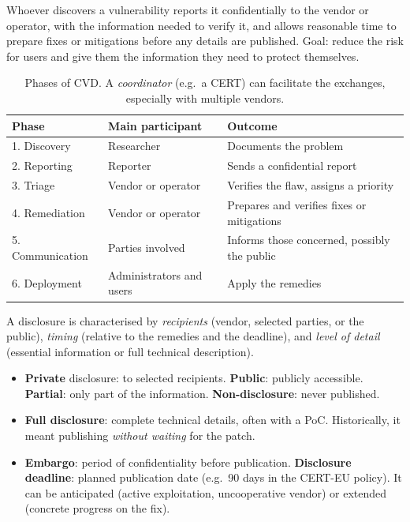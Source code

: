\begin{definition}
Whoever discovers a vulnerability reports it confidentially to the vendor or operator, with the information needed to verify it, and allows reasonable time to prepare fixes or mitigations before any details are published. Goal: reduce the risk for users and give them the information they need to protect themselves.
\end{definition}

\begin{table}[H]
\centering
\caption{Phases of CVD. A \emph{coordinator} (e.g.\ a CERT) can facilitate the exchanges, especially with multiple vendors.}
\label{tab:cvd}
\begin{tabular}{@{}lll@{}}
\toprule
Phase & Main participant & Outcome \\
\midrule
1. Discovery     & Researcher               & Documents the problem \\
2. Reporting     & Reporter                 & Sends a confidential report \\
3. Triage        & Vendor or operator       & Verifies the flaw, assigns a priority \\
4. Remediation   & Vendor or operator       & Prepares and verifies fixes or mitigations \\
5. Communication & Parties involved         & Informs those concerned, possibly the public \\
6. Deployment    & Administrators and users & Apply the remedies \\
\bottomrule
\end{tabular}
\end{table}

A disclosure is characterised by \emph{recipients} (vendor, selected parties, or the public), \emph{timing} (relative to the remedies and the deadline), and \emph{level of detail} (essential information or full technical description).

\begin{itemize}
    \item \textbf{Private} disclosure: to selected recipients. \textbf{Public}: publicly accessible. \textbf{Partial}: only part of the information. \textbf{Non-disclosure}: never published.
    \item \textbf{Full disclosure}: complete technical details, often with a PoC. Historically, it meant publishing \emph{without waiting} for the patch.
    \item \textbf{Embargo}: period of confidentiality before publication. \textbf{Disclosure deadline}: planned publication date (e.g.\ 90 days in the CERT-EU policy). It can be anticipated (active exploitation, uncooperative vendor) or extended (concrete progress on the fix).
\end{itemize}

